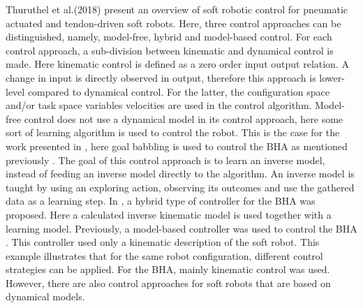 Thuruthel et al.(2018) \cite{george2018control} present an overview of soft robotic control for pneumatic actuated and tendon-driven soft robots. Here, three control approaches can be distinguished, namely, model-free, hybrid and model-based control. For each control approach, a sub-division between kinematic and dynamical control is made. Here kinematic control is defined as a zero order input output relation. A change in input is directly observed in output, therefore this approach is lower-level compared to dynamical control. For the latter, the configuration space and/or task space variables velocities are used in the control algorithm. Model-free
control does not use a dynamical model in its control approach, here some sort of learning algorithm is used to control the robot. This is the case for the work presented in  \cite{rolf2013efficient}, here goal babbling is used to control the BHA as mentioned previously \cite{rolf2012constant}. The goal of this control approach is to learn an inverse model, instead of feeding an inverse model directly to the algorithm. An inverse model is taught by using an exploring action, observing its outcomes and use the gathered data as a learning step. In \cite{reinhart2017hybrid}, a hybrid type of controller for the BHA was proposed. Here a calculated inverse kinematic model is used together with a learning model. Previously, a model-based controller was used to control the BHA \cite{mahl2014bhakin}. This controller used only a kinematic description of the soft robot. This example illustrates that for the same robot configuration, different control strategies can be applied. For the BHA, mainly kinematic control was used. However, there are also control approaches for soft robots that are based on dynamical models. 















